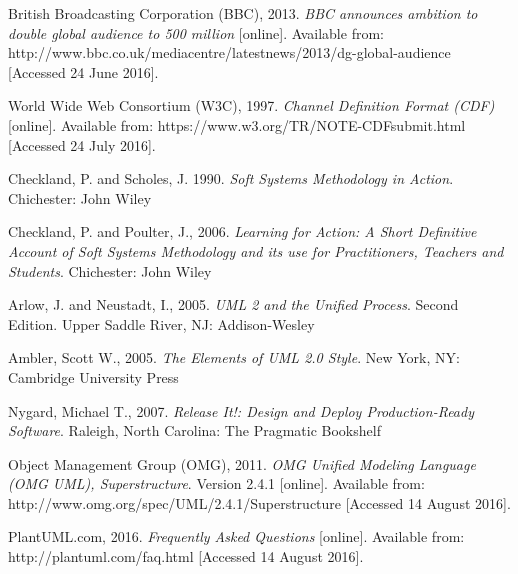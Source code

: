 \documentclass{article}
\begin{document}
\begin{thebibliography}{9}

British Broadcasting Corporation (BBC), 2013.
\textit{BBC announces ambition to double global audience to 500 million} [online].
Available from: http://www.bbc.co.uk/mediacentre/latestnews/2013/dg-global-audience [Accessed 24 June 2016].

World Wide Web Consortium (W3C), 1997.
\textit{Channel Definition Format (CDF)} [online].
Available from: https://www.w3.org/TR/NOTE-CDFsubmit.html
[Accessed 24 July 2016].

Checkland, P. and Scholes, J. 1990.
\textit{Soft Systems Methodology in Action}.
Chichester: John Wiley

Checkland, P. and Poulter, J., 2006.
\textit{Learning for Action: A Short Definitive Account of Soft Systems Methodology and its use for Practitioners, Teachers and Students}.
Chichester: John Wiley

Arlow, J. and Neustadt, I., 2005.
\textit{UML 2 and the Unified Process}. Second Edition.
Upper Saddle River, NJ: Addison-Wesley

Ambler, Scott W., 2005.
\textit{The Elements of UML 2.0 Style}.
New York, NY: Cambridge University Press

Nygard, Michael T., 2007.
\textit{Release It!: Design and Deploy Production-Ready Software}.
Raleigh, North Carolina: The Pragmatic Bookshelf

Object Management Group (OMG), 2011.
\textit{OMG Unified Modeling Language (OMG UML), Superstructure}. Version 2.4.1 [online].
Available from: http://www.omg.org/spec/UML/2.4.1/Superstructure
[Accessed 14 August 2016].

PlantUML.com, 2016.
\textit{Frequently Asked Questions} [online].
Available from: http://plantuml.com/faq.html
[Accessed 14 August 2016].

\end{thebibliography}
\end{document}
